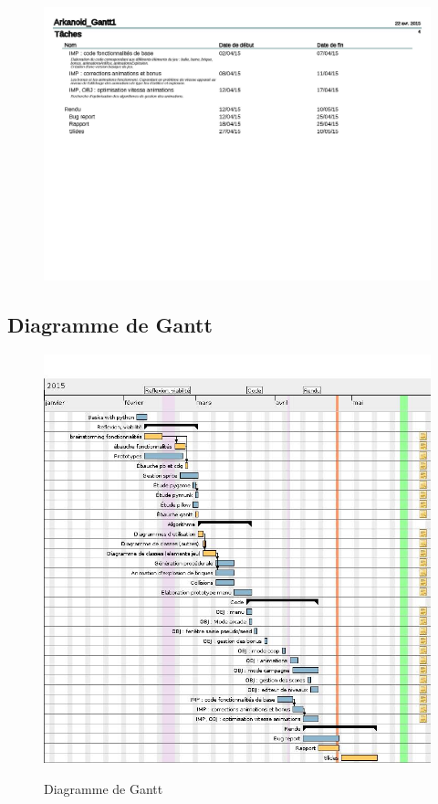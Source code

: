   \begin{figure}[h!]
    \includegraphics[width=1\textwidth]{img/WK3.jpg}\\
  \end{figure}
  
  \newpage
  \subsection{Diagramme de Gantt}
  	\begin{figure}[h!]
      \caption{Diagramme de Gantt}
      \includegraphics[width=1.1\textwidth]{img/gantt.jpg}\\[2em]
    \end{figure}
  
